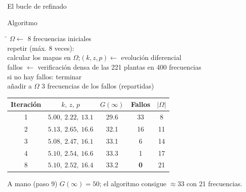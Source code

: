 \documentclass[aspectratio=169,11pt]{beamer}
\begin{document}
\begin{frame}{El bucle de refinado}
  \footnotesize
  \begin{block}{Algoritmo}
    \begin{tabbing}
    \hspace{0.5cm}\=\kill
    $\Omega\leftarrow$ 8 frecuencias iniciales\\
    repetir (máx. 8 veces):\\
    \> calcular los mapas en $\Omega$;\quad $(k,z,p)\leftarrow$ evolución diferencial\\
    \> fallos $\leftarrow$ verificación densa de las 221 plantas en 400 frecuencias\\
    \> si no hay fallos: terminar\\
    \> añadir a $\Omega$ 3 frecuencias de los fallos (repartidas)
    \end{tabbing}
  \end{block}
  \begin{center}
  \begin{tabular}{c|c|c|c|c}
    Iteración & $k,\,z,\,p$ & $G(\infty)$ & Fallos & $|\Omega|$\\\hline
    1 & $5.00,\ 2.22,\ 13.1$ & 29.6 & 33 & 8\\
    2 & $5.13,\ 2.65,\ 16.6$ & 32.1 & 16 & 11\\
    3 & $5.08,\ 2.47,\ 16.1$ & 33.1 & 6 & 14\\
    4 & $5.10,\ 2.54,\ 16.6$ & 33.3 & 1 & 17\\
    8 & $5.10,\ 2.52,\ 16.4$ & 33.2 & \textbf{0} & 21
  \end{tabular}
  \end{center}
  \footnotesize A mano (paso 9) $G(\infty)=50$; el algoritmo consigue $\approx33$ con 21 frecuencias.
\end{frame}
\end{document}
